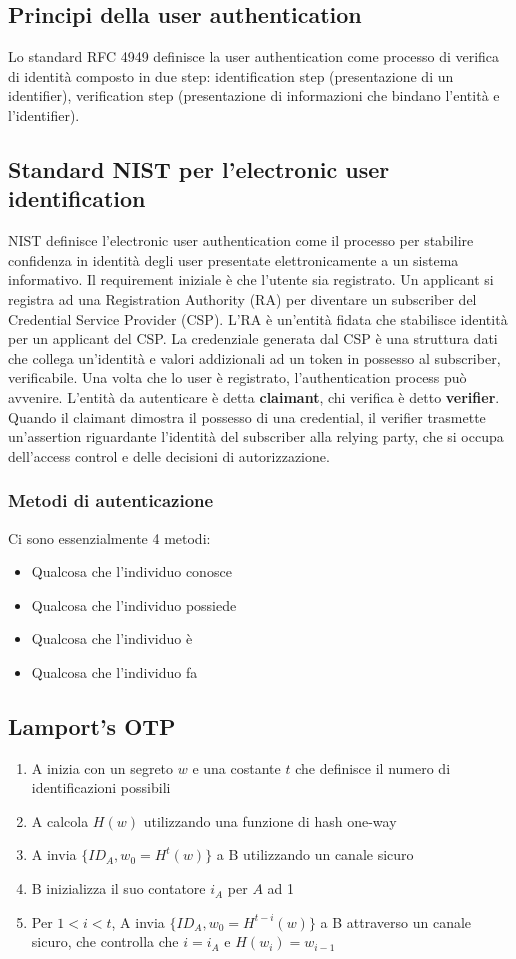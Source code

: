 \documentclass[11pt]{article}
\begin{document}
\subsection{Principi della user authentication}
Lo standard RFC 4949 definisce la user authentication come processo di verifica di identità composto in due step: identification step (presentazione di un identifier), verification step (presentazione di informazioni che bindano l'entità e l'identifier).
\subsection{Standard NIST per l'electronic user identification}
NIST definisce l'electronic user authentication come il processo per stabilire confidenza in identità degli user presentate elettronicamente a un sistema informativo. Il requirement iniziale è che l'utente sia registrato. Un applicant si registra ad una Registration Authority (RA) per diventare un subscriber del Credential Service Provider (CSP). L'RA è un'entità fidata che stabilisce identità per un applicant del CSP. La credenziale generata dal CSP è una struttura dati che collega un'identità e valori addizionali ad un token in possesso al subscriber, verificabile. Una volta che lo user è registrato, l'authentication process può avvenire. L'entità da autenticare è detta \textbf{claimant}, chi verifica è detto \textbf{verifier}. Quando il claimant dimostra il possesso di una credential, il verifier trasmette un'assertion riguardante l'identità del subscriber alla relying party, che si occupa dell'access control e delle decisioni di autorizzazione.
\subsubsection{Metodi di autenticazione}
Ci sono essenzialmente 4 metodi:
\begin{itemize}
    \item Qualcosa che l'individuo conosce
    \item Qualcosa che l'individuo possiede
    \item Qualcosa che l'individuo è
    \item Qualcosa che l'individuo fa
\end{itemize}
\subsection{Lamport's OTP}
\begin{enumerate}
    \item A inizia con un segreto $w$ e una costante $t$ che definisce il numero di identificazioni possibili
    \item A calcola $H(w)$ utilizzando una funzione di hash one-way 
    \item A invia $\{ID_A, w_0 = H^t(w)\}$ a B utilizzando un canale sicuro
    \item B inizializza il suo contatore $i_A$ per $A$ ad 1
    \item Per $1<i<t$, A invia $\{ID_A, w_0 = H^{t-i}(w)\}$ a B attraverso un canale sicuro, che controlla che $i=i_A$ e $H(w_i)=w_{i-1}$
\end{enumerate}
\end{document}
